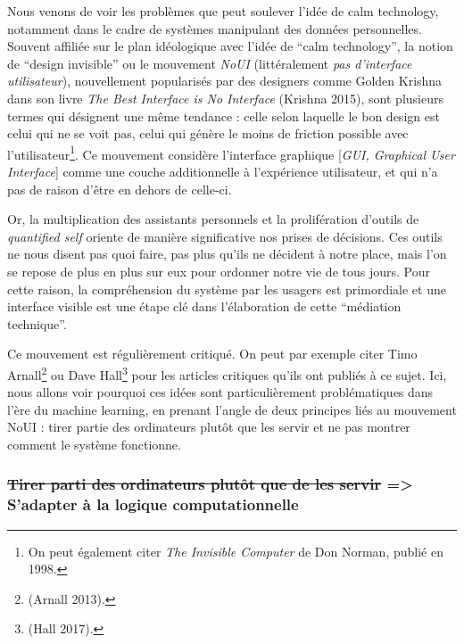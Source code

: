 \documentclass[]{article}
\begin{document}
Nous venons de voir les problèmes que peut soulever l'idée de calm
technology, notamment dans le cadre de systèmes manipulant des données
personnelles. Souvent affiliée sur le plan idéologique avec l'idée de
``calm technology'', la notion de ``design invisible'' ou le mouvement
\emph{NoUI} (littéralement \emph{pas d'interface utilisateur}),
nouvellement popularisés par des designers comme Golden Krishna dans son
livre \emph{The Best Interface is No Interface} (Krishna 2015), sont
plusieurs termes qui désignent une même tendance : celle selon laquelle
le bon design est celui qui ne se voit pas, celui qui génère le moins de
friction possible avec l'utilisateur\footnote{On peut également citer
  \emph{The Invisible Computer} de Don Norman, publié en 1998.}. Ce
mouvement considère l'interface graphique {[}\emph{GUI, Graphical User
Interface}{]} comme une couche additionnelle à l'expérience utilisateur,
et qui n'a pas de raison d'être en dehors de celle-ci.

Or, la multiplication des assistants personnels et la prolifération
d'outils de \emph{quantified self} oriente de manière significative nos
prises de décisions. Ces outils ne nous disent pas quoi faire, pas plus
qu'ils ne décident à notre place, mais l'on se repose de plus en plus
sur eux pour ordonner notre vie de tous jours. Pour cette raison, la
compréhension du système par les usagers est primordiale et une
interface visible est une étape clé dans l'élaboration de cette
``médiation technique''.

Ce mouvement est régulièrement critiqué. On peut par exemple citer Timo
Arnall\footnote{(Arnall 2013).} ou Dave Hall\footnote{(Hall 2017).} pour
les articles critiques qu'ils ont publiés à ce sujet. Ici, nous allons
voir pourquoi ces idées sont particulièrement problématiques dans l'ère
du machine learning, en prenant l'angle de deux principes liés au
mouvement NoUI : tirer partie des ordinateurs plutôt que les servir et
ne pas montrer comment le système fonctionne.

\newpage

\hypertarget{tirer-parti-des-ordinateurs-plutuxf4t-que-de-les-servir-sadapter-uxe0-la-logique-computationnelle}{%
\subsubsection{\texorpdfstring{\sout{Tirer parti des ordinateurs plutôt
que de les servir} =\textgreater{} S'adapter à la logique
computationnelle}{Tirer parti des ordinateurs plutôt que de les servir =\textgreater{} S'adapter à la logique computationnelle}}\label{tirer-parti-des-ordinateurs-plutuxf4t-que-de-les-servir-sadapter-uxe0-la-logique-computationnelle}}
\end{document}
